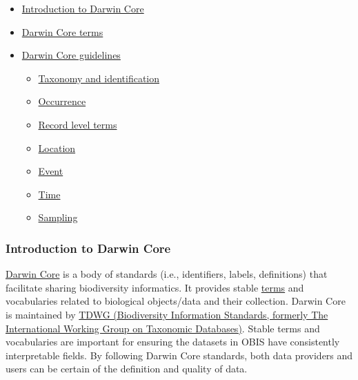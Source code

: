 \documentclass[
  letterpaper,
  DIV=11,
  numbers=noendperiod,
  oneside]{scrreprt}
\providecommand{\tightlist}{%
  \setlength{\itemsep}{0pt}\setlength{\parskip}{0pt}}\usepackage{longtable,booktabs,array}
\begin{document}
\begin{itemize}
\tightlist
\item
  \protect\hyperlink{introduction-to-darwin-core}{Introduction to Darwin
  Core}
\item
  \protect\hyperlink{darwin-core-terms}{Darwin Core terms}\\
\item
  \protect\hyperlink{darwin-core-guidelines}{Darwin Core guidelines}

  \begin{itemize}
  \tightlist
  \item
    \protect\hyperlink{taxonomy-and-identification}{Taxonomy and
    identification}
  \item
    \protect\hyperlink{occurrence}{Occurrence}\\
  \item
    \protect\hyperlink{record-level-terms}{Record level terms}\\
  \item
    \protect\hyperlink{location}{Location}\\
  \item
    \protect\hyperlink{event}{Event}
  \item
    \protect\hyperlink{time}{Time}\\
  \item
    \protect\hyperlink{sampling}{Sampling}
  \end{itemize}
\end{itemize}

\hypertarget{introduction-to-darwin-core}{%
\subsubsection{Introduction to Darwin
Core}\label{introduction-to-darwin-core}}

\href{https://dwc.tdwg.org/}{Darwin Core} is a body of standards (i.e.,
identifiers, labels, definitions) that facilitate sharing biodiversity
informatics. It provides stable
\href{https://dwc.tdwg.org/terms/}{terms} and vocabularies related to
biological objects/data and their collection. Darwin Core is maintained
by \href{http://tdwg.org/}{TDWG (Biodiversity Information Standards,
formerly The International Working Group on Taxonomic Databases)}.
Stable terms and vocabularies are important for ensuring the datasets in
OBIS have consistently interpretable fields. By following Darwin Core
standards, both data providers and users can be certain of the
definition and quality of data.
\end{document}
